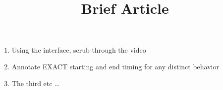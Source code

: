 \documentclass[11pt, oneside]{article}   	%
\title{Brief Article}
\begin{document}


\begin{enumerate}
  \item Using the interface, scrub through the video
  \item Annotate EXACT starting and end timing for any distinct behavior
  \item The third etc \ldots
\end{enumerate}

\end{document}
